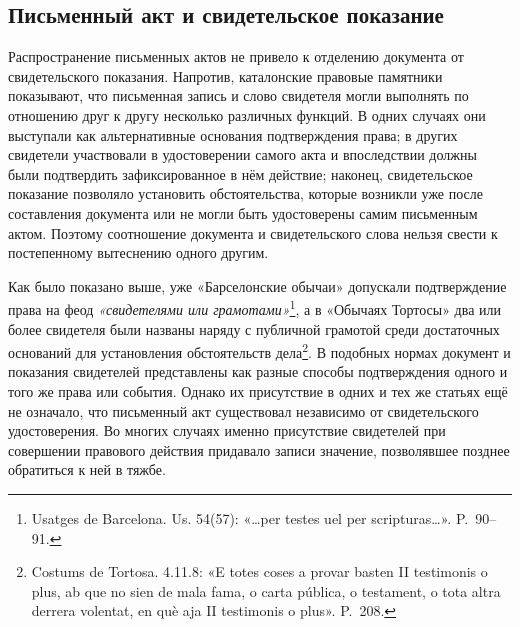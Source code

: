 \subsection{Письменный акт и свидетельское показание}

Распространение письменных актов не привело к отделению документа от свидетельского показания. Напротив, каталонские правовые памятники показывают, что письменная запись и слово свидетеля могли выполнять по отношению друг к другу несколько различных функций. В одних случаях они выступали как альтернативные основания подтверждения права; в других свидетели участвовали в удостоверении самого акта и впоследствии должны были подтвердить зафиксированное в нём действие; наконец, свидетельское показание позволяло установить обстоятельства, которые возникли уже после составления документа или не могли быть удостоверены самим письменным актом. Поэтому соотношение документа и свидетельского слова нельзя свести к постепенному вытеснению одного другим.

Как было показано выше, уже «Барселонские обычаи» допускали подтверждение права на феод \emph{«свидетелями или грамотами»}\footnote{Usatges de Barcelona. Us. 54(57): «…per testes uel per scripturas…». P.~90--91.}, а в «Обычаях Тортосы» два или более свидетеля были названы наряду с публичной грамотой среди достаточных оснований для установления обстоятельств дела\footnote{Costums de Tortosa. 4.11.8: «E totes coses a provar basten II testimonis o plus, ab que no sien de mala fama, o carta pública, o testament, o tota altra derrera volentat, en què aja II testimonis o plus». P.~208.}. В подобных нормах документ и показания свидетелей представлены как разные способы подтверждения одного и того же права или события. Однако их присутствие в одних и тех же статьях ещё не означало, что письменный акт существовал независимо от свидетельского удостоверения. Во многих случаях именно присутствие свидетелей при совершении правового действия придавало записи значение, позволявшее позднее обратиться к ней в тяжбе.

